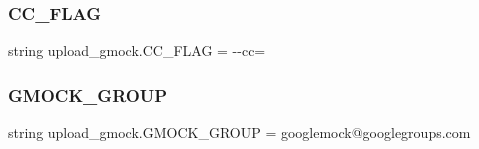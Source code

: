 \subsubsection{\texorpdfstring{CC\_FLAG}{CC\_FLAG}}
{\footnotesize\ttfamily string upload\+\_\+gmock.\+C\+C\+\_\+\+F\+L\+AG = \textquotesingle{}-\/-\/cc=\textquotesingle{}}

\mbox{\label{namespaceupload__gmock_acf8fe60647d8c3748b0e22dcf669efee}} 
\subsubsection{\texorpdfstring{GMOCK\_GROUP}{GMOCK\_GROUP}}
{\footnotesize\ttfamily string upload\+\_\+gmock.\+G\+M\+O\+C\+K\+\_\+\+G\+R\+O\+UP = \textquotesingle{}googlemock@googlegroups.\+com\textquotesingle{}}


